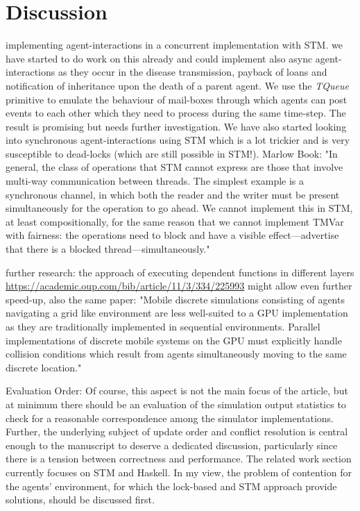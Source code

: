 \section{Discussion}
implementing agent-interactions in a concurrent implementation with STM. we have started to do work on this already and could implement also async agent-interactions as they occur in the disease transmission, payback of loans and notification of inheritance upon the death of a parent agent. We use the \textit{TQueue} primitive to emulate the behaviour of mail-boxes through which agents can post events to each other which they need to process during the same time-step. The result is promising but needs further investigation. We have also started looking into synchronous agent-interactions using STM which is a lot trickier and is very susceptible to dead-locks (which are still possible in STM!).
Marlow Book: "In general, the class of operations that STM cannot express are those that involve multi-way communication between threads. The simplest example is a synchronous channel, in which both the reader and the writer must be present simultaneously for the operation to go ahead. We cannot implement this in STM, at least compositionally, for the same reason that we cannot implement TMVar with fairness: the operations need to block and have a visible effect—advertise that there is a blocked thread—simultaneously."


further research: the approach of executing dependent functions in different layers \url{https://academic.oup.com/bib/article/11/3/334/225993} might allow even further speed-up, also the same paper: "Mobile discrete simulations consisting of agents navigating a grid like environment are less well-suited to a GPU implementation as they are traditionally implemented in sequential environments. Parallel implementations of discrete mobile systems on the GPU must explicitly handle collision conditions which result from agents simultaneously moving to the same discrete location."


Evaluation Order: Of course, this aspect is not the main focus of the article, but at minimum there should be an evaluation of the simulation output statistics to check for a reasonable correspondence among the simulator implementations. Further, the underlying subject of update order and conflict resolution is central enough to the manuscript to deserve a dedicated discussion, particularly since there is a tension between correctness and performance. The related work section currently focuses on STM and Haskell. In my view, the problem of contention for the agents' environment, for which the lock-based and STM approach provide solutions, should be discussed first.